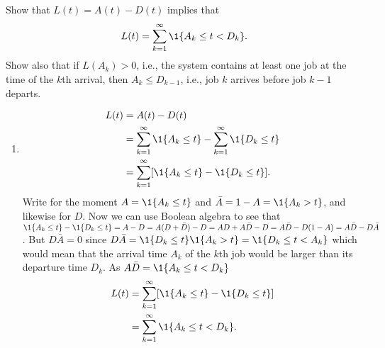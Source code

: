 \begin{question} Show that $L(t) = A(t)-D(t)$ implies that 
  \begin{equation*}
    L(t) = \sum_{k=1}^\infty \1{A_k \leq t < D_k}.
  \end{equation*}
 Show also that if $L(A_k)>0$, i.e., the system contains at least one
  job at the time of the $k$th arrival, then $A_k \leq D_{k-1}$, i.e.,
  job $k$ arrives before job $k-1$ departs.


\begin{solution}
  \begin{enumerate}
  \item 
  \begin{equation*}
    \begin{split}
      L(t)
&= A(t) - D(t) \\
&= \sum_{k=1}^\infty \1{A_k \leq t} -  \sum_{k=1}^\infty \1{D_k \leq t} \\
&= \sum_{k=1}^\infty [\1{A_k \leq t} -  \1{D_k \leq t}].
    \end{split}
  \end{equation*}
  Write for the moment $A=\1{A_k \leq t}$ and
  $\bar A = 1- A = \1{A_k > t}$, and likewise for $D$. Now we can use
  Boolean algebra to see that
  $\1{A_k \leq t} - \1{D_k \leq t} = A-D = A(D+\bar D) -D = AD +
  A\bar D - D = A\bar D - D(1-A) = A\bar D - D \bar A$.
  But $D \bar A = 0$ since
  $D \bar A = \1{D_k \leq t} \1{A_k > t} = \1{D_k \leq t < A_k}$
  which would mean that the arrival time $A_k$ of the $k$th job would
  be larger than its departure time $D_k$. As $A \bar D = \1{A_k \leq t < D_k}$
  \begin{equation*}
    \begin{split}
      L(t)
&= \sum_{k=1}^\infty [\1{A_k \leq t} -  \1{D_k \leq t}] \\
&= \sum_{k=1}^\infty \1{A_k \leq t < D_k}.
    \end{split}
  \end{equation*}


\end{enumerate}
\end{solution}
\end{question}
